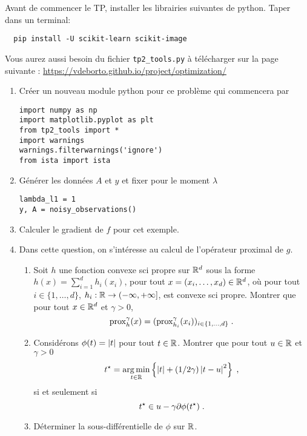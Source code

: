 \documentclass[a4paper,french,12pt]{article}
\begin{document}
Avant de commencer le TP, installer les librairies suivantes de python. Taper dans un terminal:
\begin{lstlisting}
  pip install -U scikit-learn scikit-image
\end{lstlisting}

Vous aurez aussi besoin du fichier \lstinline+tp2_tools.py+ à télécharger sur la page suivante : \url{https://vdeborto.github.io/project/optimization/}

\begin{enumerate}
\item Créer un nouveau module python pour ce problème qui commencera par
\begin{lstlisting}
import numpy as np
import matplotlib.pyplot as plt
from tp2_tools import *
import warnings
warnings.filterwarnings('ignore')
from ista import ista
\end{lstlisting}
\item Générer les données $A$ et $y$ et fixer pour le moment $\lambda$
  \begin{lstlisting}
lambda_l1 = 1
y, A = noisy_observations()
  \end{lstlisting}
\item Calculer le gradient de $f$ pour cet exemple.
\item Dans cette question, on s'intéresse au calcul de l'opérateur
  proximal de $g$.
  \begin{enumerate}
  \item Soit $h$ une fonction convexe sci propre sur $\mathbb{R}^d$ sous la
    forme $h(x)= \sum_{i=1}^d h_i(x_i)$, pour tout
    $x = (x_i,\ldots,x_d)\in \mathbb{R}^d$, où pour tout
    $i \in \{1,\ldots,d\}$,
    $h_i : \mathbb{R} \to \left(-\infty,+\infty\right]$, est convexe sci
    propre. Montrer que pour tout $x \in \mathbb{R}^d$ et $\gamma >0$,
    \begin{equation*}
      \operatorname{prox}_h^{\gamma}(x) = (      \operatorname{prox}_{h_i}^{\gamma}(x_i))_{i \in \{1,\ldots,d\}} \;. 
    \end{equation*}
  \item Considérons $\phi(t) = \left\vert t \right\vert$ pour tout $t \in \mathbb{R}$.
    Montrer que pour tout $u \in \mathbb{R}$ et $\gamma >0$
    \begin{equation*}
      t^{\star} = \mathop{\mathrm{arg\,min}}_{t \in \mathbb{R}} \left\lbrace \left\vert t \right\vert + (1/2\gamma) \left\vert t-u \right\vert^2 \right\rbrace \;,
    \end{equation*}
    si et seulement si
    \begin{equation*}
      t^{\star} \in u - \gamma \partial \phi(t^{\star}) \;. 
    \end{equation*}
  \item Déterminer la sous-différentielle de $\phi$ sur $\mathbb{R}$.
    

\end{enumerate}
\end{enumerate}
\end{document}
